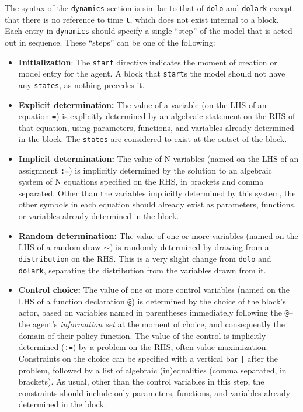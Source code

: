 \documentclass[12pt,pdftex,letterpaper]{article}
\begin{document}
The syntax of the \texttt{dynamics} section is similar to that of \texttt{dolo} and \texttt{dolark} except that there is no reference to time \texttt{t}, which does not exist internal to a block. Each entry in \texttt{dynamics} should specify a single ``step'' of the model that is acted out in sequence. These ``steps'' can be one of the following:

\begin{itemize}
	\item \textbf{Initialization}: The \texttt{start} directive indicates the moment of creation or model entry for the agent. A block that \texttt{start}s the model should not have any \texttt{states}, as nothing precedes it.
	
	\item \textbf{Explicit determination:} The value of a variable (on the LHS of an equation \texttt{=}) is explicitly determined by an algebraic statement on the RHS of that equation, using parameters, functions, and variables already determined in the block. The \texttt{states} are considered to exist at the outset of the block.
	
	\item \textbf{Implicit determination:} The value of N variables (named on the LHS of an assignment \texttt{:=}) is implicitly determined by the solution to an algebraic system of N equations specified on the RHS, in brackets and comma separated. Other than the variables implicitly determined by this system, the other symbols in each equation should already exist as parameters, functions, or variables already determined in the block.
	
	\item \textbf{Random determination:} The value of one or more variables (named on the LHS of a random draw \texttt{$\sim$}) is randomly determined by drawing from a \texttt{distribution} on the RHS. This is a very slight change from \texttt{dolo} and \texttt{dolark}, separating the distribution from the variables drawn from it.
	
	\item \textbf{Control choice:} The value of one or more control variables (named on the LHS of a function declaration \texttt{@}) is determined by the choice of the block's actor, based on variables named in parentheses immediately following the \texttt{@}-- the agent's \textit{information set} at the moment of choice, and consequently the domain of their policy function. The value of the control is implicitly determined (\texttt{:=}) by a problem on the RHS, often value maximization. 	Constraints on the choice can be specified with a vertical bar \texttt{|} after the problem, followed by a list of algebraic (in)equalities (comma separated, in brackets). As usual, other than the control variables in this step, the constraints should include only parameters, functions, and variables already determined in the block.
\end{itemize}
\end{document}
